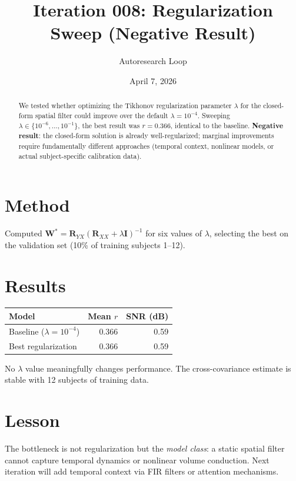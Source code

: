 \documentclass[11pt,a4paper]{article}
\title{Iteration 008: Regularization Sweep (Negative Result)}
\author{Autoresearch Loop}
\date{April 7, 2026}
\begin{document}
\maketitle

\begin{abstract}
We tested whether optimizing the Tikhonov regularization parameter $\lambda$
for the closed-form spatial filter could improve over the default $\lambda=10^{-4}$.
Sweeping $\lambda \in \{10^{-6}, \ldots, 10^{-1}\}$, the best result was
$r=0.366$, identical to the baseline. \textbf{Negative result}: the closed-form
solution is already well-regularized; marginal improvements require fundamentally
different approaches (temporal context, nonlinear models, or actual subject-specific
calibration data).
\end{abstract}

\section{Method}
Computed $\mathbf{W}^* = \mathbf{R}_{YX}(\mathbf{R}_{XX} + \lambda\mathbf{I})^{-1}$
for six values of $\lambda$, selecting the best on the validation set (10\% of
training subjects 1--12).

\section{Results}
\begin{table}[H]
\centering
\begin{tabular}{lrr}
\toprule
Model & Mean $r$ & SNR (dB) \\
\midrule
Baseline ($\lambda=10^{-4}$) & 0.366 & 0.59 \\
Best regularization & 0.366 & 0.59 \\
\bottomrule
\end{tabular}
\end{table}

No $\lambda$ value meaningfully changes performance. The cross-covariance
estimate is stable with 12 subjects of training data.

\section{Lesson}
The bottleneck is not regularization but the \emph{model class}: a static
spatial filter cannot capture temporal dynamics or nonlinear volume conduction.
Next iteration will add temporal context via FIR filters or attention mechanisms.
\end{document}
